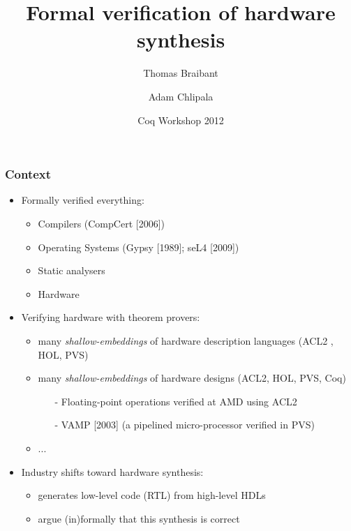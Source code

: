 \documentclass[9pt]{beamer}
\title{Formal verification of hardware synthesis}%
\author{Thomas Braibant \and Adam Chlipala}
\institute[UoG, MIT]{University of Grenoble \and MIT CSAIL}
\date[08/2012]{Coq Workshop 2012}
\newcommand{\redemph}[1]{\alert{\emph{#1}}}
\begin{document}
\newcommand \orange[1]{{\color{orange}{#1}}}

\newcommand\parenthesis[1] {
  \begin{flushright}
    {\scriptsize \redemph{{{{ #1}}}}}
  \end{flushright}

}

\begin{frame}
  \center 
  \titlepage
\end{frame} 

\begin{frame}
  \frametitle{Context}
  
  \begin{itemize}
  \item  Formally verified everything:
    \begin{itemize}
    \item Compilers (CompCert [2006])
    \item Operating Systems (Gypsy [1989]; seL4 [2009])
    \item Static analysers
    \item \alert<2->{Hardware}
    \end{itemize}
  
  \pause

  \item Verifying hardware with theorem provers:
    \begin{itemize}
    \item many \emph{shallow-embeddings} of hardware description languages (ACL2 , HOL, PVS)
    \item many \emph{shallow-embeddings} of hardware designs (ACL2, HOL, PVS, Coq) 
      \begin{itemize}
      \item[-] Floating-point operations verified at AMD using ACL2 
      \item[-] VAMP [2003]  (a pipelined micro-processor verified in PVS)
      \end{itemize}
    \item ...
    \end{itemize}

    \pause
    
  \item Industry shifts toward \alert{hardware synthesis}: 
    \begin{itemize}
    \item generates low-level code (RTL) from high-level HDLs
    \item argue (in)formally that this synthesis is correct
    \end{itemize}
  \end{itemize}
\end{frame}
\end{document}
